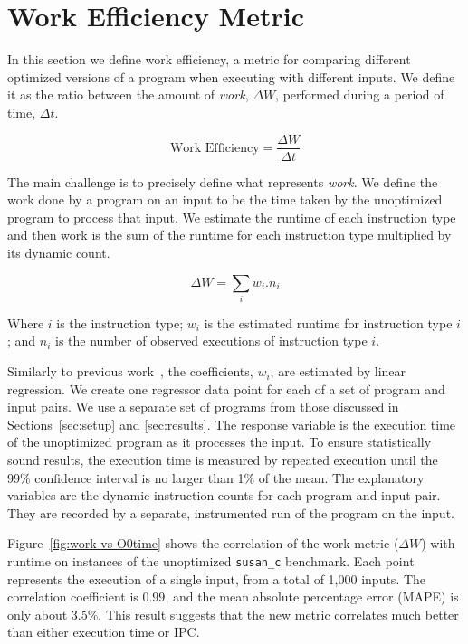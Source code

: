 \section{Work Efficiency Metric} \label{sec:metric}

    In this section we define work efficiency, a metric for comparing different optimized versions of a program when executing with
    different inputs. We define it as the ratio between the amount of \textit{work}, $\Delta W$, performed during a period of time, $\Delta
    t$.

    \[
       \textrm{Work Efficiency} = \frac{\Delta W}{\Delta t}
    \]

    The main challenge is to precisely define what represents \textit{work}. We define the work done by a program on an input to be the
    time taken by the unoptimized program to process that input. We estimate the runtime of each instruction type and then work is the sum
    of the runtime for each instruction type multiplied by its dynamic count.

    \[ \Delta W = \sum_i w_i.n_i \]

    Where $i$ is the instruction type; $w_i$ is the estimated runtime for instruction type $i$; and $n_i$ is the number of observed
    executions of instruction type $i$.

    Similarly to previous work~\citep{giusto01,powell09,brandolese11}, the coefficients, $w_i$, are estimated by linear regression. We create
    one regressor data point for each of a set of program and input pairs.
    We use a separate set of programs from those discussed in Sections~\ref{sec:setup} and \ref{sec:results}.
    The response variable is the execution time of the unoptimized program as it processes the input. To ensure
    statistically sound results, the execution time is measured by repeated execution until the 99\% confidence interval is no larger than 1\% of
    the mean. The explanatory variables are the dynamic instruction counts for each program and input pair. They are recorded by a separate,
    instrumented run of the program on the input.

    Figure~\ref{fig:work-vs-O0time} shows the correlation of the work metric ($\Delta W$) with runtime on instances of the unoptimized \texttt{susan\_c} benchmark.
    Each point represents the execution of a single input, from a total of 1,000 inputs.
    The correlation coefficient is $0.99$, and the mean absolute percentage error (MAPE) is only about 3.5\%.
    This result suggests that the new metric correlates much better than either execution time or IPC.

